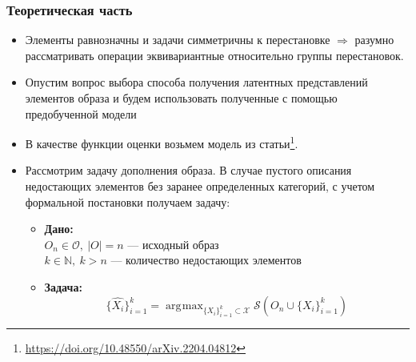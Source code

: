 \documentclass[10pt]{beamer}
\DeclareMathOperator*{\argmax}{\arg\!\max}
\begin{document}
\begin{frame}
	\frametitle{Теоретическая часть}
	\begin{itemize}
		\item Элементы равнозначны и задачи симметричны к перестановке $\Longrightarrow$ разумно рассматривать операции эквивариантные относительно группы перестановок.
	
		\item Опустим вопрос выбора способа получения латентных представлений элементов образа и будем использовать
		 полученные с помощью предобученной модели
				
	 	\item В качестве функции оценки возьмем модель из статьи\footnote{\url{https://doi.org/10.48550/arXiv.2204.04812}}.
		
		 \item Рассмотрим задачу дополнения образа. В случае пустого описания недостающих элементов без заранее определенных категорий, с учетом формальной постановки получаем задачу:
		   \begin{itemize}
		   	\item \textbf{Дано:}\\
		   	$O_n\in\mathcal{O}, ~|O| = n$ --- исходный образ \\
		   	$k \in \mathbb{N}, ~k > n$ --- количество недостающих элементов\\					
		   	\item \textbf{Задача:}\\
		   	$$\{\hat{X_i}\}_{i=1}^k= \argmax_{\{X_i\}_{i=1}^k\subset\mathcal{X}} \mathcal{S}\left(O_n\cup\{X_i\}_{i=1}^k\right)$$
		   \end{itemize}
	   \end{itemize}
\end{frame}
\end{document}
